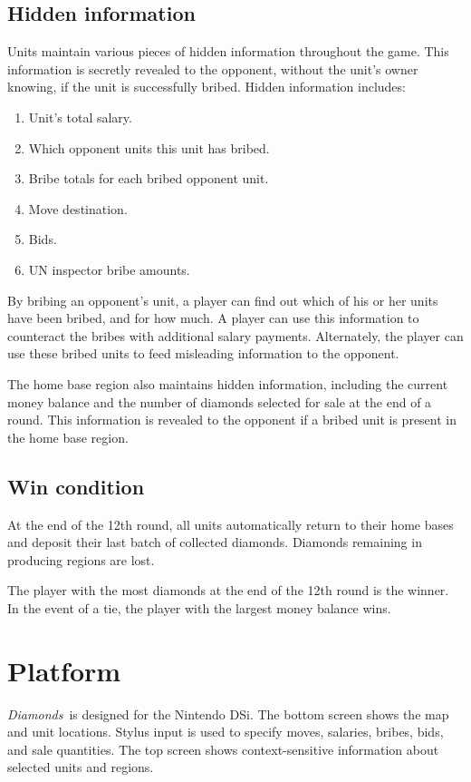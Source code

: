 \documentclass[12pt]{article}
\newcommand{\gtitle}{{\it Diamonds}}
\begin{document}
\subsection{Hidden information}
Units maintain various pieces of hidden information throughout the game.  This information is secretly revealed to the opponent, without the unit's owner knowing, if the unit is successfully bribed.  Hidden information includes:
\begin{enumerate}
\item Unit's total salary.
\item Which opponent units this unit has bribed.
\item Bribe totals for each bribed opponent unit.
\item Move destination.
\item Bids.
\item UN inspector bribe amounts.
\end{enumerate}
By bribing an opponent's unit, a player can find out which of his or her units have been bribed, and for how much.  A player can use this information to counteract the bribes with additional salary payments.  Alternately, the player can use these bribed units to feed misleading information to the opponent.

The home base region also maintains hidden information, including the current money balance and the number of diamonds selected for sale at the end of a round.  This information is revealed to the opponent if a bribed unit is present in the home base region.



\subsection{Win condition}
At the end of the 12th round, all units automatically return to their home bases and deposit their last batch of collected diamonds.  Diamonds remaining in producing regions are lost.

The player with the most diamonds at the end of the 12th round is the winner.  In the event of a tie, the player with the largest money balance wins.


\section{Platform}

\gtitle\ is designed for the Nintendo DSi.  The bottom screen shows the map and unit locations.  Stylus input is used to specify moves, salaries, bribes, bids, and sale quantities.  The top screen shows context-sensitive information about selected units and regions.
\end{document}
